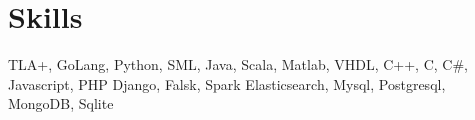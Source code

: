 \section{Skills}

  {TLA+, GoLang, Python, SML, Java, Scala, Matlab, VHDL, C++, C, C\#, Javascript, PHP}
  {Django, Falsk, Spark}
  {Elasticsearch, Mysql, Postgresql, MongoDB, Sqlite}
